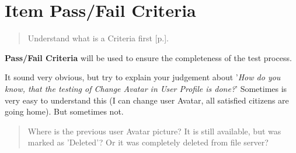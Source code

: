 \section{Item Pass/Fail Criteria}
\label{sec:Item Pass/Fail Criteria}

\begin{quote}
Understand what is a Criteria first [p.\pageref{sec:Criteria}].
\end{quote} 

\textbf{Pass/Fail Criteria} will be used to ensure the completeness of the test process.

It sound very obvious, but try to explain your judgement about '\textit{How do you know, that the testing of Change Avatar in User Profile is done?}' Sometimes is very easy to understand this (I can change user Avatar, all satisfied citizens are going home). But sometimes not.

\begin{quote}
Where is the previous user Avatar picture? It is still available, but was marked as 'Deleted'? Or it was completely deleted from file server?
\end{quote} 

